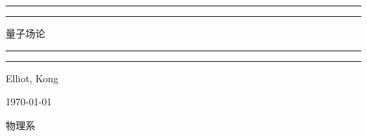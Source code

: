 \begin{titlepage}
        \centering
        \scshape

        \vspace*{5\baselineskip}

        \rule{\textwidth}{1.6pt}\vspace*{-\baselineskip}\vspace*{2pt}
        \rule{\textwidth}{0.4pt}

        \vspace{0.75\baselineskip}

        {\Huge{量子场论} \\}

        \vspace{0.75\baselineskip}

        \rule{\textwidth}{0.4pt}\vspace*{-\baselineskip}\vspace{3.2pt}
        \rule{\textwidth}{1.6pt}

        \vspace{0.5\baselineskip}

        \normalfont


        \vspace*{2\baselineskip}

        Elliot, Kong

        \vspace{0.5\baselineskip}  

        
        \vspace{2\baselineskip}


        \vfill
        \today

        \scshape

        {\large 物理系}
\end{titlepage}

